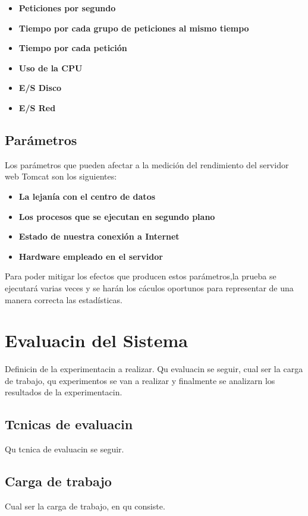 \documentclass[11pt,twoside,a4paper]{book}
\begin{document}
\begin{itemize}
  \item \textbf{Peticiones por segundo}
  \item \textbf{Tiempo por cada grupo de peticiones al mismo tiempo}
  \item \textbf{Tiempo por cada petición}
  \item \textbf{Uso de la CPU}
  \item \textbf{E/S Disco}
  \item \textbf{E/S Red}
\end{itemize}

\pagebreak
\section{Parámetros}
Los parámetros que pueden afectar a la medición del rendimiento del servidor web Tomcat son los siguientes:

\begin{itemize}
  \item \textbf{La lejanía con el centro de datos}
  \item \textbf{Los procesos que se ejecutan en segundo plano}
  \item \textbf{Estado de nuestra conexión a Internet}
  \item \textbf{Hardware empleado en el servidor}
\end{itemize}

Para poder mitigar los efectos que producen estos parámetros,la prueba se ejecutará varias veces y se harán los cáculos oportunos para representar de una manera correcta las estadísticas.

\chapter{Evaluacin del Sistema}
Definicin de la experimentacin a realizar. Qu evaluacin se seguir, cual ser la carga de trabajo, qu experimentos se van a realizar y finalmente se analizarn los resultados de la experimentacin.

\section{Tcnicas de evaluacin}
Qu tcnica de evaluacin se seguir.

\section{Carga de trabajo}
Cual ser la carga de trabajo, en qu consiste.
\end{document}

